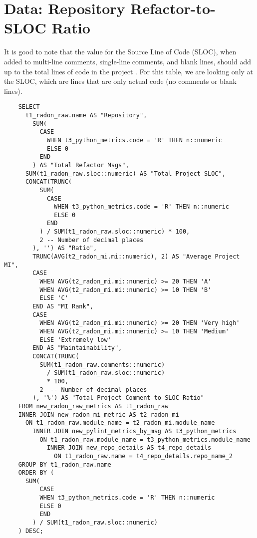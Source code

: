 \section{Data: Repository Refactor-to-SLOC Ratio} \label{appendixRefactorRatio}

It is good to note that the value for the Source Line of Code (SLOC), when added to multi-line comments, single-line comments, and blank lines, should add up to the total lines of code in the project \cite{radon:docs}. For this table, we are looking only at the SLOC, which are lines that are only actual code (no comments or blank lines).

\begin{singlespace}
  \begin{verbatim}
    SELECT
      t1_radon_raw.name AS "Repository",
        SUM(
          CASE
            WHEN t3_python_metrics.code = 'R' THEN n::numeric
            ELSE 0
          END
        ) AS "Total Refactor Msgs",
      SUM(t1_radon_raw.sloc::numeric) AS "Total Project SLOC",
      CONCAT(TRUNC(
          SUM(
            CASE
              WHEN t3_python_metrics.code = 'R' THEN n::numeric
              ELSE 0
            END
          ) / SUM(t1_radon_raw.sloc::numeric) * 100,
          2 -- Number of decimal places
        ), '') AS "Ratio",
        TRUNC(AVG(t2_radon_mi.mi::numeric), 2) AS "Average Project MI",
        CASE
          WHEN AVG(t2_radon_mi.mi::numeric) >= 20 THEN 'A'
          WHEN AVG(t2_radon_mi.mi::numeric) >= 10 THEN 'B'
          ELSE 'C'
        END AS "MI Rank",
        CASE
          WHEN AVG(t2_radon_mi.mi::numeric) >= 20 THEN 'Very high'
          WHEN AVG(t2_radon_mi.mi::numeric) >= 10 THEN 'Medium'
          ELSE 'Extremely low'
        END AS "Maintainability",
        CONCAT(TRUNC(
          SUM(t1_radon_raw.comments::numeric) 
            / SUM(t1_radon_raw.sloc::numeric) 
            * 100, 
          2  -- Number of decimal places
        ), '%') AS "Total Project Comment-to-SLOC Ratio"
    FROM new_radon_raw_metrics AS t1_radon_raw
    INNER JOIN new_radon_mi_metric AS t2_radon_mi
      ON t1_radon_raw.module_name = t2_radon_mi.module_name
        INNER JOIN new_pylint_metrics_by_msg AS t3_python_metrics
          ON t1_radon_raw.module_name = t3_python_metrics.module_name
            INNER JOIN new_repo_details AS t4_repo_details
              ON t1_radon_raw.name = t4_repo_details.repo_name_2
    GROUP BY t1_radon_raw.name
    ORDER BY (
      SUM(
          CASE
          WHEN t3_python_metrics.code = 'R' THEN n::numeric
          ELSE 0
          END
        ) / SUM(t1_radon_raw.sloc::numeric)
    ) DESC;    
  \end{verbatim}
\end{singlespace}

